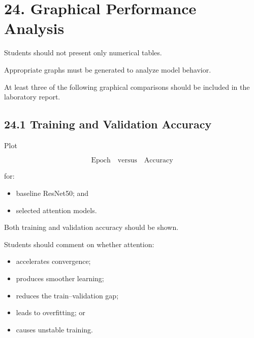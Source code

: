 \documentclass[10pt]{article}
\begin{document}
\section*{24. Graphical Performance Analysis}

Students should not present only numerical tables.

Appropriate graphs must be generated to analyze model behavior.

At least three of the following graphical comparisons should be included in
the laboratory report.

\subsection*{24.1 Training and Validation Accuracy}

Plot

\[
\text{Epoch}
\quad\text{versus}\quad
\text{Accuracy}
\]

for:

\begin{itemize}

\item baseline ResNet50; and

\item selected attention models.

\end{itemize}

Both training and validation accuracy should be shown.

Students should comment on whether attention:

\begin{itemize}

\item accelerates convergence;

\item produces smoother learning;

\item reduces the train--validation gap;

\item leads to overfitting; or

\item causes unstable training.

\end{itemize}
\end{document}
